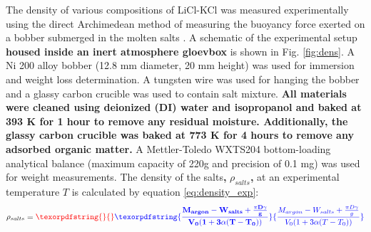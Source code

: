 \documentclass[review]{elsarticle}
\providecommand{\DIFaddtex}[1]{{\bf #1}} %
\providecommand{\DIFdeltex}[1]{} %
\providecommand{\DIFaddbegin}{\protect\color{blue}} %
\providecommand{\DIFaddend}{\protect\color{black}} %
\providecommand{\DIFdelbegin}{\protect\color{red}} %
\providecommand{\DIFdelend}{\protect\color{black}} %
\providecommand{\DIFadd}[1]{\texorpdfstring{\DIFaddtex{#1}}{#1}} %
\providecommand{\DIFdel}[1]{\texorpdfstring{\DIFdeltex{#1}}{}} %
\newcommand{\DIFscaledelfig}{0.5}
\newlength{\DIFdelgraphicswidth} %
\newlength{\DIFdelgraphicsheight} %
\newcommand{\DIFaddincludegraphics}[2][]{{\color{blue}\fbox{\DIFOincludegraphics[#1]{#2}}}} %
\newcommand{\DIFdelincludegraphics}[2][]{%
\sbox{\DIFdelgraphicsbox}{\DIFOincludegraphics[#1]{#2}}%
\settoboxwidth{\DIFdelgraphicswidth}{\DIFdelgraphicsbox} %
\settoboxtotalheight{\DIFdelgraphicsheight}{\DIFdelgraphicsbox} %
\scalebox{\DIFscaledelfig}{%
\parbox[b]{\DIFdelgraphicswidth}{\usebox{\DIFdelgraphicsbox}\\[-\baselineskip] \rule{\DIFdelgraphicswidth}{0em}}\llap{\resizebox{\DIFdelgraphicswidth}{\DIFdelgraphicsheight}{%
\setlength{\unitlength}{\DIFdelgraphicswidth}%
\begin{picture}(1,1)%
\thicklines\linethickness{2pt} %
{\color[rgb]{1,0,0}\put(0,0){\framebox(1,1){}}}%
{\color[rgb]{1,0,0}\put(0,0){\line( 1,1){1}}}%
{\color[rgb]{1,0,0}\put(0,1){\line(1,-1){1}}}%
\end{picture}%
}\hspace*{3pt}}} %
} %
\DeclareRobustCommand{\DIFaddbegin}{\DIFOaddbegin \let\includegraphics\DIFaddincludegraphics} %
\DeclareRobustCommand{\DIFaddend}{\DIFOaddend \let\includegraphics\DIFOincludegraphics} %
\DeclareRobustCommand{\DIFdelbegin}{\DIFOdelbegin \let\includegraphics\DIFdelincludegraphics} %
\DeclareRobustCommand{\DIFdelend}{\DIFOaddend \let\includegraphics\DIFOincludegraphics} %
\begin{document}
\DIFaddend The density of various compositions of LiCl-KCl was measured experimentally using the direct Archimedean method of measuring the buoyancy force exerted on a bobber submerged in the molten salts \cite{Sato2009}. A schematic of the experimental setup \DIFaddbegin \DIFadd{housed inside an inert atmosphere gloevbox }\DIFaddend is shown in Fig. \ref{fig:dens}. A Ni 200 alloy bobber (12.8 mm diameter, 20 mm height) was used for immersion and weight loss determination. A tungsten wire was used for hanging the bobber and a glassy carbon crucible was used to contain salt mixture. \DIFaddbegin \DIFadd{All materials were cleaned using deionized (DI) water and isopropanol and baked at 393 K for 1 hour to remove any residual moisture. Additionally, the glassy carbon crucible was baked at 773 K for 4 hours to remove any adsorbed organic matter. }\DIFaddend A Mettler-Toledo WXTS204 bottom-loading analytical balance (maximum capacity of 220g and precision of 0.1 mg) was used for weight measurements. The density of the salts\DIFaddbegin \DIFadd{, }\DIFaddend $\rho_{salts}$\DIFaddbegin \DIFadd{, }\DIFaddend at an experimental temperature $T$ is calculated by equation \ref{eq:density_exp}:
\begin{equation}
    \label{eq:density_exp}
    \rho_{salts} = \DIFdelbegin \DIFdel{\frac{M_{air} - W_{salts}}{V_0 (1 + 3\alpha(T - T_0))}
}\DIFdelend \DIFaddbegin \DIFadd{\frac{M_{argon} - W_{salts} + \frac{ \pi D\gamma}{g} }{V_0 (1 + 3\alpha(T - T_0))}
}\DIFaddend \end{equation}
\end{document}
